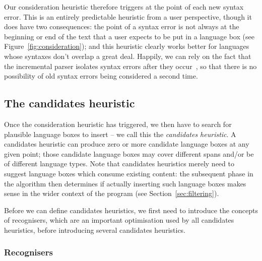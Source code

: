 \documentclass[sigplan,screen]{acmart}\settopmatter{printfolios=true,printccs=false,printacmref=false}
\begin{document}
Our consideration heuristic therefore triggers at the point of each new syntax error.
This is an entirely predictable heuristic from a user perspective, though it
does have two consequences: the point of a syntax error is not always at the
beginning or end of the text that a user expects to be put in a language box
(see Figure~\ref{fig:consideration}); and this heuristic clearly works better
for languages whose syntaxes don't overlap a great deal. Happily, we can rely
on the fact that the incremental parser isolates syntax errors after they
occur~\cite[p.~93]{wagner98practicalalgorithms}, so that there is no
possibility of old syntax errors being considered a second time.


\subsection{The candidates heuristic}

Once the consideration heuristic has triggered, we then have to search for
plausible language boxes to insert -- we call this the \emph{candidates heuristic}. A candidates heuristic
can produce zero or more candidate language boxes at any given point; those
candidate language boxes may cover different spans and/or be of different
language types. Note that candidates heuristics merely need to suggest language
boxes which consume existing content: the subsequent phase in the algorithm
then determines if actually inserting such language boxes makes sense in the
wider context of the program (see Section~\ref{sec:filtering}).

Before we can define candidates heuristics, we first need to introduce the
concepts of recognisers, which are an important optimisation used by all
candidates heuristics, before introducing several candidates heuristics.


\subsubsection{Recognisers}
\label{sec:recognisers}
\end{document}

